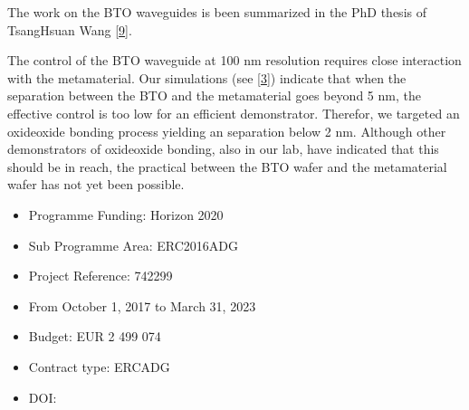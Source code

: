 \documentclass[a4paper,10pt,english,openany,oneside]{jupyterBook}
\begin{document}
\sphinxAtStartPar
The work on the BTO waveguides is been summarized in the PhD thesis of Tsang\sphinxhyphen{}Hsuan Wang {[}\hyperlink{cite.bib:id12}{9}{]}.

\begin{DUlineblock}{0em}
\item[] 
\end{DUlineblock}

\sphinxAtStartPar
The control of the BTO waveguide at 100 nm resolution requires close interaction with the metamaterial. Our simulations (see {[}\hyperlink{cite.bib:id4}{3}{]}) indicate that when the separation between the BTO and the metamaterial goes beyond 5 nm, the effective control is too low for an efficient demonstrator. Therefor, we targeted an oxide\sphinxhyphen{}oxide bonding process yielding an separation below 2 nm. Although other demonstrators of oxide\sphinxhyphen{}oxide bonding, also in our lab, have indicated that this should be in reach, the practical between the BTO wafer and the metamaterial wafer has not yet been possible.

\begin{DUlineblock}{0em}
\item[] 
\end{DUlineblock}
\begin{itemize}
\item {} 
\sphinxAtStartPar
Programme Funding: Horizon 2020

\item {} 
\sphinxAtStartPar
Sub Programme Area: ERC\sphinxhyphen{}2016\sphinxhyphen{}ADG

\item {} 
\sphinxAtStartPar
Project Reference: 742299

\item {} 
\sphinxAtStartPar
From October 1, 2017 to March 31, 2023

\item {} 
\sphinxAtStartPar
Budget: EUR 2 499 074

\item {} 
\sphinxAtStartPar
Contract type: ERC\sphinxhyphen{}ADG

\item {} 
\sphinxAtStartPar
DOI: 

\end{itemize}

\sphinxstepscope
\end{document}
